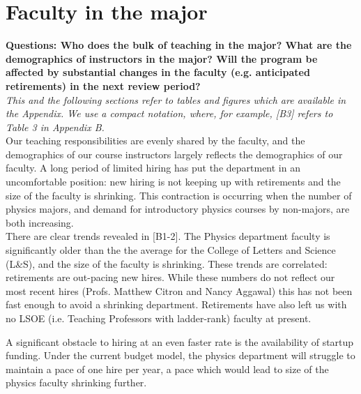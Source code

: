 \documentclass[12pt]{article}
\begin{document}
\newpage
\section{Faculty in the major}
\label{sec:faculty}

{\bf Questions: Who does the bulk of teaching in the major? What are
  the demographics of instructors in the major? Will the program be
  affected by substantial changes in the faculty (e.g. anticipated
  retirements) in the next review period?}\\[3pt]

\noindent
{\it This and the following sections refer to tables and figures which are available in the
  Appendix.  We use a compact notation, where, for example, [B3]
  refers to Table 3 in Appendix B.}\\[3pt]  

\noindent
Our teaching responsibilities are evenly shared by the faculty, and
the demographics of our course instructors largely reflects the
demographics of our faculty.  A long period of limited hiring has put
the department in an uncomfortable position: new hiring is not keeping
up with retirements and the size of the faculty is shrinking.  This
contraction is occurring when the number of physics majors, and demand
for introductory physics courses by non-majors, are both
increasing.\\[3pt]

 There are clear trends
revealed in [B1-2].  The Physics department faculty is significantly
older than the the average for the College of Letters and Science
(L\&S), and the size of the faculty is shrinking.  These trends are
correlated: retirements are out-pacing new hires.  While these numbers
do not reflect our most recent hires (Profs. Matthew Citron and Nancy
Aggawal) this has not been fast enough to avoid a shrinking
department.  Retirements have also left us with no LSOE (i.e. Teaching
Professors with ladder-rank) faculty at present.

A significant obstacle to hiring at an even faster rate is the
availability of startup funding.  Under the current budget model, the
physics department will struggle to maintain a pace of one hire per
year, a pace which would lead to size of the physics faculty shrinking
further.\\[3pt]
\end{document}
